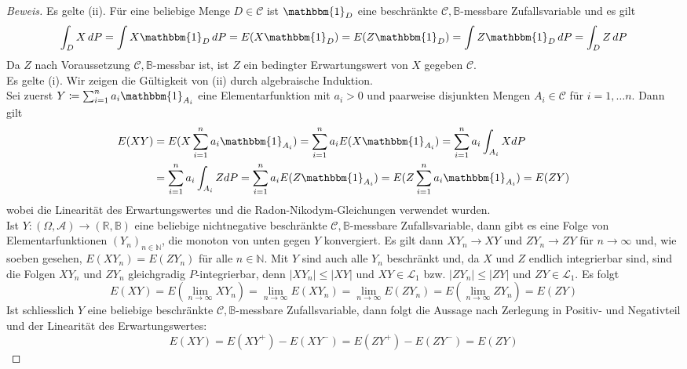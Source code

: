 \documentclass[10pt]{article}
\begin{document}
\begin{proof}[Beweis]  
Es gelte (ii). Für eine beliebige Menge $D \in \mathcal{C}$ ist $\mathbbm{1}_D$ eine beschränkte $\mathcal{C},\mathbb{B}$-messbare Zufallsvariable und es gilt
$$
\int_{D} X \,dP = \int X \mathbbm{1}_D \,dP = E(X \mathbbm{1}_D) = E(Z \mathbbm{1}_D) =  \int Z \mathbbm{1}_D \,dP = \int_{D} Z \,dP
$$
Da $Z$ nach Voraussetzung $\mathcal{C},\mathbb{B}$-messbar ist, ist $Z$ ein bedingter Erwartungswert von $X$ gegeben $\mathcal{C}$. \\

Es gelte (i). Wir zeigen die Gültigkeit von (ii) durch algebraische Induktion. \\
Sei zuerst $Y \coloneqq \sum_{i=1}^{n} a_i \mathbbm{1}_{A_i}$ eine Elementarfunktion mit $a_i > 0$ und paarweise disjunkten Mengen $A_i \in \mathcal{C}$ für $i=1, \dots n$. Dann gilt
\begin{align*}
E(XY) &= E(X  \sum_{i=1}^{n} a_i \mathbbm{1}_{A_i}) =  \sum_{i=1}^{n} a_i E(X \mathbbm{1}_{A_i}) =  \sum_{i=1}^{n} a_i \int_{A_i} X dP \\
	  &=  \sum_{i=1}^{n} a_i \int_{A_i} Z dP =  \sum_{i=1}^{n} a_i E(Z \mathbbm{1}_{A_i}) =  E(Z \sum_{i=1}^{n} a_i \mathbbm{1}_{A_i}) = E(ZY) 
\end{align*}
wobei die Linearität des Erwartungswertes und die Radon-Nikodym-Gleichungen verwendet wurden. \\
Ist $Y:(\Omega, \mathcal{A}) \rightarrow (\mathbb{R}, \mathbb{B})$ eine beliebige nichtnegative beschränkte $\mathcal{C},\mathbb{B}$-messbare Zufallsvariable, dann gibt es eine Folge von Elementarfunktionen $(Y_n)_{n \in \mathbb{N}}$, die monoton von unten gegen $Y$ konvergiert. Es gilt dann $XY_n \rightarrow XY$ und $ZY_n \rightarrow ZY$ für $n \to \infty$ und, wie soeben gesehen, $E(XY_n) = E(ZY_n)$ für alle $n \in \mathbb{N}$. Mit $Y$ sind auch alle $Y_n$ beschränkt und, da $X$ und $Z$ endlich integrierbar sind, sind die Folgen $XY_n$ und $ZY_n$ gleichgradig $P$-integrierbar, denn $|XY_n| \leq |XY|$ und $XY \in \mathcal{L}_1$ bzw. $|ZY_n| \leq |ZY|$ und $ZY \in \mathcal{L}_1$. Es folgt
$$
E(XY) = E( \lim_{n \to \infty} XY_n) =  \lim_{n \to \infty} E(X Y_n) =  \lim_{n \to \infty} E(Z Y_n) = E(\lim_{n \to \infty} ZY_n) = E(ZY)
$$
Ist schliesslich $Y$ eine beliebige beschränkte $\mathcal{C},\mathbb{B}$-messbare Zufallsvariable, dann folgt die Aussage nach Zerlegung in Positiv- und Negativteil und der Linearität des Erwartungswertes:
$$
E(XY) = E(XY^+)-E(XY^-) = E(ZY^+)-E(ZY^-) = E(ZY) 
$$
 
\end{proof}
 
\end{document}
